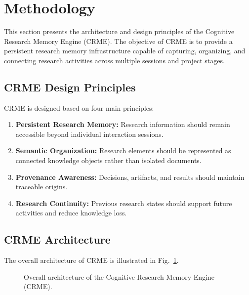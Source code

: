 \section{Methodology}
\label{sec:methodology}


This section presents the architecture and design principles of the
Cognitive Research Memory Engine (CRME). The objective of CRME is to
provide a persistent research memory infrastructure capable of capturing,
organizing, and connecting research activities across multiple sessions
and project stages.


\subsection{CRME Design Principles}

CRME is designed based on four main principles:

\begin{enumerate}

\item \textbf{Persistent Research Memory:}
Research information should remain accessible beyond individual
interaction sessions.

\item \textbf{Semantic Organization:}
Research elements should be represented as connected knowledge
objects rather than isolated documents.

\item \textbf{Provenance Awareness:}
Decisions, artifacts, and results should maintain traceable origins.

\item \textbf{Research Continuity:}
Previous research states should support future activities and reduce
knowledge loss.

\end{enumerate}



\subsection{CRME Architecture}

The overall architecture of CRME is illustrated in
Fig.~\ref{fig:crme_architecture}.


\begin{figure}[t]
\centering

\caption{Overall architecture of the Cognitive Research Memory Engine (CRME).}
\label{fig:crme_architecture}
\end{figure}


